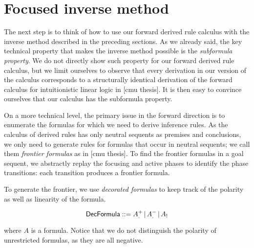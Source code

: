 \section{Focused inverse method}

The next step is to think of how to use our forward derived rule calculus with
the inverse method described in the preceding sections. As we already said, the
key technical property that makes the inverse method possible is the
\emph{subformula property}.  We do not directly show such property for our
forward derived rule calculus, but we limit ourselves to observe that every
derivation in our version of the calculus corresponds to a structurally
identical derivation of the forward calculus for intuitionistic linear logic in
[cmu thesis]. It is then easy to convince ourselves that our calculus has the
subformula property.

On a more technical level, the primary issue in the forward direction is to
enumerate the formulas for which we need to derive inference rules. As the
calculus of derived rules has only neutral sequents as premises and conclusions,
we only need to generate rules for formulas that occur in neutral sequents; we
call them \emph{frontier formulas} as in [cmu thesis]. To find the frontier
formulas in a goal sequent, we abstractly replay the focusing and active phases
to identify the phase transitions: each transition produces a frontier
formula.

To generate the frontier, we use \emph{decorated formulas} to keep track of the
polarity as well as linearity of the formula.

\[
  \textsf{DecFormula} ::= A_.^+ \, | \,
    A_.^- \, | \,
    A_!
\]

where $A$ is a formula. Notice that we do not distinguish the polarity of
unrestricted formulas, as they are all negative.

